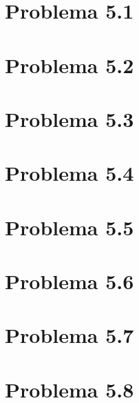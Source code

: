 \section{Problema 5.1}

\newpage

\section{Problema 5.2}

\newpage

\section{Problema 5.3}

\newpage

\section{Problema 5.4}

\newpage

\section{Problema 5.5}

\newpage

\section{Problema 5.6}

\newpage

\section{Problema 5.7}

\newpage

\section{Problema 5.8}

